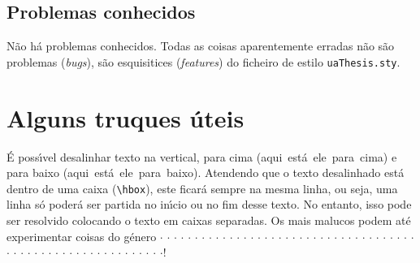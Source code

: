 \documentclass[11pt,twoside,a4paper]{report}
\begin{document}
\section{Problemas conhecidos}

N\~ao h\'a problemas conhecidos. Todas as coisas aparentemente erradas n\~ao s\~ao problemas
(\textit{bugs}), s\~ao esquisitices (\textit{features}) do ficheiro de estilo \verb:uaThesis.sty:.


\cleardoublepage
\chapter{Alguns truques \'uteis}

\'E poss\'\i vel desalinhar texto na vertical, para cima
  \raise 2pt\hbox{(aqui est\'a ele para cima)}
e para baixo
  \lower 2pt\hbox{(aqui est\'a ele para baixo)}.
Atendendo que o texto desalinhado est\'a dentro de uma caixa (\verb+\hbox+), este
ficar\'a sempre na mesma linha, ou seja, uma linha s\'o poder\'a ser partida no
in\'\i cio ou no fim desse texto. No entanto,
\raise -2.25pt\hbox{isso}
\raise -1.75pt\hbox{pode}
\raise -1.25pt\hbox{ser}
\raise -0.75pt\hbox{resolvido}
\raise -0.25pt\hbox{colocando}
\raise  0.25pt\hbox{o}
\raise  0.75pt\hbox{texto}
\raise  1.25pt\hbox{em}
\raise  1.75pt\hbox{caixas}
\raise  2.25pt\hbox{separadas}.
Os mais malucos podem at\'e experimentar coisas do g\'enero
\raise  0.000pt\hbox{$\cdot$}%
\raise  1.236pt\hbox{$\cdot$}%
\raise  2.351pt\hbox{$\cdot$}%
\raise  3.236pt\hbox{$\cdot$}%
\raise  3.804pt\hbox{$\cdot$}%
\raise  4.000pt\hbox{$\cdot$}%
\raise  3.804pt\hbox{$\cdot$}%
\raise  3.236pt\hbox{$\cdot$}%
\raise  2.351pt\hbox{$\cdot$}%
\raise  1.236pt\hbox{$\cdot$}%
\raise  0.000pt\hbox{$\cdot$}\-%
\raise -1.236pt\hbox{$\cdot$}%
\raise -2.351pt\hbox{$\cdot$}%
\raise -3.236pt\hbox{$\cdot$}%
\raise -3.804pt\hbox{$\cdot$}%
\raise -4.000pt\hbox{$\cdot$}%
\raise -3.804pt\hbox{$\cdot$}%
\raise -3.236pt\hbox{$\cdot$}%
\raise -2.351pt\hbox{$\cdot$}%
\raise -1.236pt\hbox{$\cdot$}%
\raise  0.000pt\hbox{$\cdot$}\-%
\raise  1.236pt\hbox{$\cdot$}%
\raise  2.351pt\hbox{$\cdot$}%
\raise  3.236pt\hbox{$\cdot$}%
\raise  3.804pt\hbox{$\cdot$}%
\raise  4.000pt\hbox{$\cdot$}%
\raise  3.804pt\hbox{$\cdot$}%
\raise  3.236pt\hbox{$\cdot$}%
\raise  2.351pt\hbox{$\cdot$}%
\raise  1.236pt\hbox{$\cdot$}%
\raise  0.000pt\hbox{$\cdot$}\-%
\raise -1.236pt\hbox{$\cdot$}%
\raise -2.351pt\hbox{$\cdot$}%
\raise -3.236pt\hbox{$\cdot$}%
\raise -3.804pt\hbox{$\cdot$}%
\raise -4.000pt\hbox{$\cdot$}%
\raise -3.804pt\hbox{$\cdot$}%
\raise -3.236pt\hbox{$\cdot$}%
\raise -2.351pt\hbox{$\cdot$}%
\raise -1.236pt\hbox{$\cdot$}%
\raise  0.000pt\hbox{$\cdot$}\-%
\raise  1.236pt\hbox{$\cdot$}%
\raise  2.351pt\hbox{$\cdot$}%
\raise  3.236pt\hbox{$\cdot$}%
\raise  3.804pt\hbox{$\cdot$}%
\raise  4.000pt\hbox{$\cdot$}%
\raise  3.804pt\hbox{$\cdot$}%
\raise  3.236pt\hbox{$\cdot$}%
\raise  2.351pt\hbox{$\cdot$}%
\raise  1.236pt\hbox{$\cdot$}%
\raise  0.000pt\hbox{$\cdot$}\-%
\raise -1.236pt\hbox{$\cdot$}%
\raise -2.351pt\hbox{$\cdot$}%
\raise -3.236pt\hbox{$\cdot$}%
\raise -3.804pt\hbox{$\cdot$}%
\raise -4.000pt\hbox{$\cdot$}%
\raise -3.804pt\hbox{$\cdot$}%
\raise -3.236pt\hbox{$\cdot$}%
\raise -2.351pt\hbox{$\cdot$}%
\raise -1.236pt\hbox{$\cdot$}!
\end{document}
